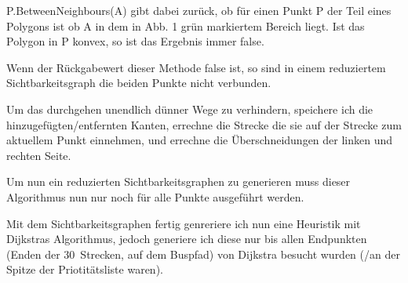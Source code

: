 \documentclass[12pt]{article}
\begin{document}
\begin{minipage}{0.6\textwidth}
P.BetweenNeighbours(A) gibt dabei zurück, ob für einen Punkt P der Teil eines Polygons ist ob A in dem in Abb. 1 grün markiertem Bereich liegt. Ist das Polygon in P konvex, so ist das Ergebnis immer false.

Wenn der Rückgabewert dieser Methode false ist, so sind in einem reduziertem Sichtbarkeitsgraph die beiden Punkte nicht verbunden.
\end{minipage}\hspace{0.5cm}
\begin{minipage}{0.35\textwidth}
\end{minipage}

Um das durchgehen unendlich dünner Wege zu verhindern, speichere ich die hinzugefügten/entfernten Kanten, errechne die Strecke die sie auf der Strecke zum aktuellem Punkt einnehmen, und errechne die Überschneidungen der linken und rechten Seite.

Um nun ein reduzierten Sichtbarkeitsgraphen zu generieren muss dieser Algorithmus nun nur noch für alle Punkte ausgeführt werden.

Mit dem Sichtbarkeitsgraphen fertig genreriere ich nun eine Heuristik mit Dijkstras Algorithmus, jedoch generiere ich diese nur bis allen Endpunkten (Enden der 30\degree\ Strecken, auf dem Buspfad) von Dijkstra besucht wurden (/an der Spitze der Priotitätsliste waren).
\end{document}
